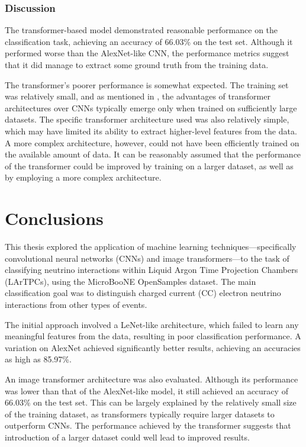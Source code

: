 \documentclass{pracalicmgr}
\begin{document}
\subsection{Discussion}

The transformer-based model demonstrated reasonable performance on the classification task, achieving an accuracy of 66.03\% on the test set. Although it performed worse than the AlexNet-like CNN, the performance metrics suggest that it did manage to extract some ground truth from the training data.

The transformer's poorer performance is somewhat expected. The training set was relatively small, and as mentioned in \cite{ViT}, the advantages of transformer architectures over CNNs typically emerge only when trained on sufficiently large datasets. The specific transformer architecture used was also relatively simple, which may have limited its ability to extract higher-level features from the data. A more complex architecture, however, could not have been efficiently trained on the available amount of data. It can be reasonably assumed that the performance of the transformer could be improved by training on a larger dataset, as well as by employing a more complex architecture.

\chapter{Conclusions}

This thesis explored the application of machine learning techniques—specifically convolutional neural networks (CNNs) and image transformers—to the task of classifying neutrino interactions within Liquid Argon Time Projection Chambers (LArTPCs), using the MicroBooNE OpenSamples dataset. The main classification goal was to distinguish charged current (CC) electron neutrino interactions from other types of events.

The initial approach involved a LeNet-like architecture, which failed to learn any meaningful features from the data, resulting in poor classification performance.
A variation on AlexNet achieved significantly better results, achieving an accuracies as high as 85.97\%.

An image transformer architecture was also evaluated. Although its performance was lower than that of the AlexNet-like model, it still achieved an accuracy of 66.03\% on the test set. This can be largely explained by the relatively small size of the training dataset, as transformers typically require larger datasets to outperform CNNs. The performance achieved by the transformer suggests that introduction of a larger dataset could well lead to improved results.
\end{document}

